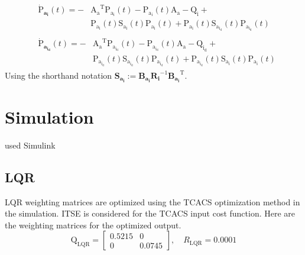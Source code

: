 \documentclass[conference]{IEEEtran}
\begin{document}
\begin{equation}\label{coupled_riccatti_LQIDG}
    \begin{split}
        &\begin{split}
            \boldsymbol{\dot{\mathrm{P}}_{a_i}}(t) = -&\boldsymbol{\mathrm{A_a}}^\mathrm{T}\boldsymbol{\mathrm{P_{a_i}}}(t) - \boldsymbol{\mathrm{P_{a_i}}}(t)\boldsymbol{\mathrm{A_a}} - \boldsymbol{\mathrm{Q_i}} +\\ &\boldsymbol{\mathrm{P_{a_i}}}(t)\boldsymbol{\mathrm{S_{a_i}}}(t)\boldsymbol{\mathrm{P_{a_i}}}(t) + \boldsymbol{\mathrm{P_{a_i}}}(t)\boldsymbol{\mathrm{S_{a_{i_d}}}}(t)\boldsymbol{\mathrm{P_{a_{i_d}}}}(t)
        \end{split}\\
        &\begin{split}
            \boldsymbol{\dot{\mathrm{P}}_{a_{i_d}}}(t) = -&\boldsymbol{\mathrm{A_a}}^\mathrm{T}\boldsymbol{\mathrm{P_{a_{i_d}}}}(t) - \boldsymbol{\mathrm{P_{a_{i_d}}}}(t)\boldsymbol{\mathrm{A_a}} - \boldsymbol{\mathrm{Q_{i_d}}} +\\ &\boldsymbol{\mathrm{P_{a_{i_d}}}}(t)\boldsymbol{\mathrm{S_{a_{i_d}}}}(t)\boldsymbol{\mathrm{P_{a_{i_d}}}}(t) + \boldsymbol{\mathrm{P_{a_{i_d}}}}(t)\boldsymbol{\mathrm{S_{a_i}}}(t)\boldsymbol{\mathrm{P_{a_i}}}(t)
        \end{split}
    \end{split}
\end{equation}
Using the shorthand notation $\boldsymbol{S_{a_i}} := \boldsymbol{B_{a_i}R_{i}}^{-1}\boldsymbol{B_{a_i}}^\mathrm{T}$. %




\section{Simulation}
used Simulink
\subsection{LQR}

LQR weighting matrices are optimized using the TCACS optimization method in the simulation.
ITSE is considered for the TCACS input cost function.
Here are the weighting matrices for the optimized output.
\begin{equation}
	\boldsymbol{\mathrm{Q}}_{\text{LQR}} = \begin{bmatrix}
		0.5215 & 0\\
		0 & 0.0745
	\end{bmatrix}, \quad R_{\text{LQR}} =  0.0001
\end{equation} 
\end{document}
